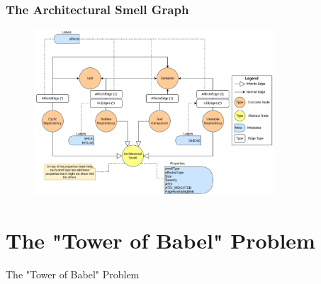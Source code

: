 \documentclass[dvipsnames, 10pt, table]{beamer}
\begin{document}
\begin{frame}
  \frametitle{The Architectural Smell Graph}
  \begin{figure}
    \begin{center}
      \includegraphics[width=0.8\textwidth]{figures/architectural-smells/arcan-smell-graph.png}
    \end{center}
  \end{figure}
\end{frame}

\section{The "Tower of Babel" Problem}
\begin{frame}
  \centering
  \Huge
  The "Tower of Babel" Problem
\end{frame}
\end{document}
